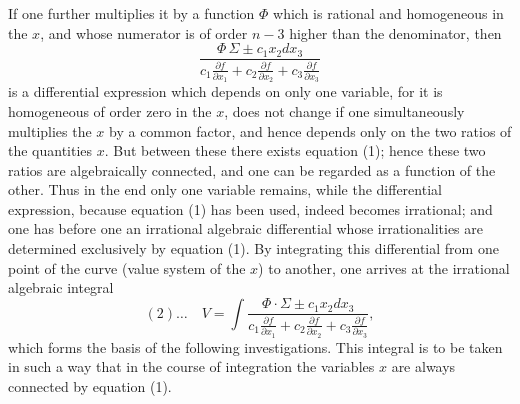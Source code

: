 \documentclass[10pt]{article}
\begin{document}
If one further multiplies it by a function $\Phi$ which is rational and homogeneous in the $x$, and whose numerator is of order $n-3$ higher than the denominator, then
\[
\frac{\Phi\,\Sigma\pm c_1x_2dx_3}{c_1\frac{\partial f}{\partial x_1}+c_2\frac{\partial f}{\partial x_2}+c_3\frac{\partial f}{\partial x_3}}
\]
is a differential expression which depends on only one variable, for it is homogeneous of order zero in the $x$, does not change if one simultaneously multiplies the $x$ by a common factor, and hence depends only on the two ratios of the quantities $x$. But between these there exists equation (1); hence these two ratios are algebraically connected, and one can be regarded as a function of the other. Thus in the end only one variable remains, while the differential expression, because equation (1) has been used, indeed becomes irrational; and one has before one an irrational algebraic differential whose irrationalities are determined exclusively by equation (1). By integrating this differential from one point of the curve (value system of the $x$) to another, one arrives at the irrational algebraic integral
\[
(2)\ldots\quad V=\int\frac{\Phi\cdot\Sigma\pm c_1x_2dx_3}{c_1\frac{\partial f}{\partial x_1}+c_2\frac{\partial f}{\partial x_2}+c_3\frac{\partial f}{\partial x_3}},
\]
which forms the basis of the following investigations. This integral is to be taken in such a way that in the course of integration the variables $x$ are always connected by equation (1).
\end{document}
